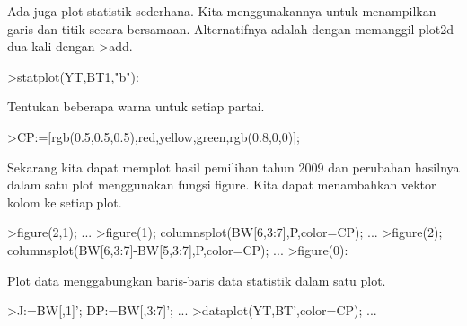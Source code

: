 \documentclass[12pt,arial,letterpaper]{book}
\begin{document}
\begin{eulercomment}
\begin{eulercomment}
\begin{eulercomment}
\begin{eulercomment}
\begin{eulercomment}
\begin{eulercomment}
\begin{eulercomment}
\begin{eulercomment}
\begin{eulercomment}
\begin{eulercomment}
\begin{eulercomment}
\begin{eulercomment}
\begin{eulercomment}
\begin{eulercomment}
\begin{eulercomment}
\begin{eulercomment}
\begin{eulercomment}
\begin{eulercomment}
\begin{eulercomment}
\begin{eulercomment}
\begin{eulercomment}
\begin{eulercomment}
\begin{eulercomment}
\begin{eulercomment}
\begin{eulercomment}
\begin{eulercomment}
\begin{eulercomment}
\begin{eulercomment}
\begin{eulercomment}
\begin{eulercomment}
\begin{eulercomment}
\begin{eulercomment}
\begin{eulerprompt}
\end{eulerprompt}
\begin{euleroutput}
  [84.29,  81.25,  81.1659,  82.7529,  72.9642,  61.8971,  79.8732]
\end{euleroutput}
\begin{eulercomment}
Ada juga plot statistik sederhana. Kita menggunakannya untuk
menampilkan garis dan titik secara bersamaan. Alternatifnya adalah
dengan memanggil plot2d dua kali dengan \textgreater{}add.
\end{eulercomment}
\begin{eulerprompt}
>statplot(YT,BT1,"b"):
\end{eulerprompt}
\begin{eulercomment}
Tentukan beberapa warna untuk setiap partai.
\end{eulercomment}
\begin{eulerprompt}
>CP:=[rgb(0.5,0.5,0.5),red,yellow,green,rgb(0.8,0,0)];
\end{eulerprompt}
\begin{eulercomment}
Sekarang kita dapat memplot hasil pemilihan tahun 2009 dan perubahan
hasilnya dalam satu plot menggunakan fungsi figure. Kita dapat
menambahkan vektor kolom ke setiap plot.
\end{eulercomment}
\begin{eulerprompt}
>figure(2,1);  ...
>figure(1); columnsplot(BW[6,3:7],P,color=CP); ...
>figure(2); columnsplot(BW[6,3:7]-BW[5,3:7],P,color=CP);  ...
>figure(0):
\end{eulerprompt}
\begin{eulercomment}
Plot data menggabungkan baris-baris data statistik dalam satu plot.
\end{eulercomment}
\begin{eulerprompt}
>J:=BW[,1]'; DP:=BW[,3:7]'; ...
>dataplot(YT,BT',color=CP);  ...

\end{eulerprompt}
\end{eulercomment}
\end{eulercomment}
\end{eulercomment}
\end{eulercomment}
\end{eulercomment}
\end{eulercomment}
\end{eulercomment}
\end{eulercomment}
\end{eulercomment}
\end{eulercomment}
\end{eulercomment}
\end{eulercomment}
\end{eulercomment}
\end{eulercomment}
\end{eulercomment}
\end{eulercomment}
\end{eulercomment}
\end{eulercomment}
\end{eulercomment}
\end{eulercomment}
\end{eulercomment}
\end{eulercomment}
\end{eulercomment}
\end{eulercomment}
\end{eulercomment}
\end{eulercomment}
\end{eulercomment}
\end{eulercomment}
\end{eulercomment}
\end{eulercomment}
\end{eulercomment}
\end{eulercomment}
\end{document}
